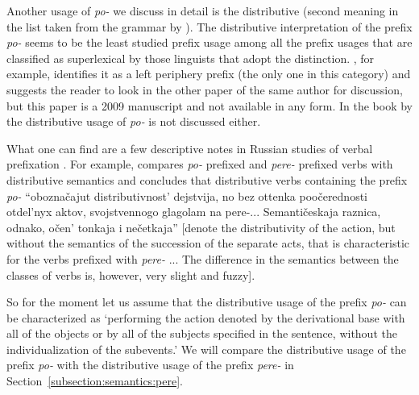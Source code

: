 Another usage of \textit{po-}   we discuss in detail is the distributive  (second meaning in the list taken from the grammar by \citealt{Shvedova:82}). The distributive  interpretation of the prefix \textit{po-}   seems to be the least studied prefix usage among all the prefix usages that are classified as superlexical by those linguists that adopt the distinction. \citet{Tatevosov:09}, for example, identifies it as a left periphery prefix  (the only one in this category) and suggests the reader to look in the other paper of the same author for discussion, but this paper is a 2009 manuscript and not available in any form. In the book by \citet{Kagan:book} the distributive  usage of \textit{po-}   is not discussed either. 

What one can find are a few descriptive notes in Russian studies of verbal prefixation . For example, \citet[289--290]{Isachenko:60} compares \textit{po-}  prefixed and \textit{pere-}  prefixed verbs with distributive  semantics and concludes that distributive  verbs containing the prefix \textit{po-}   ``obozna\v{c}ajut distributivnost' dejstvija, no bez ottenka poo\v{c}erednosti otdel'nyx aktov, svojstvennogo glagolam na pere-... Semanti\v{c}eskaja raznica, odnako, o\v{c}en' tonkaja i ne\v{c}etkaja'' [denote the distributivity of the action, but without the semantics of the succession of the separate acts, that is characteristic for the verbs prefixed with \textit{pere-}  ... The difference in the semantics between the classes of verbs is, however, very slight and fuzzy].

So for the moment let us assume that the distributive  usage of the prefix \textit{po-}   can be characterized as `performing the action denoted by the derivational base with all of the objects or by all of the subjects specified in the sentence, without the individualization of the subevents.' We will compare the distributive  usage of the prefix \textit{po-}   with the distributive  usage of the prefix \textit{pere-}   in Section~\ref{subsection:semantics:pere}.

